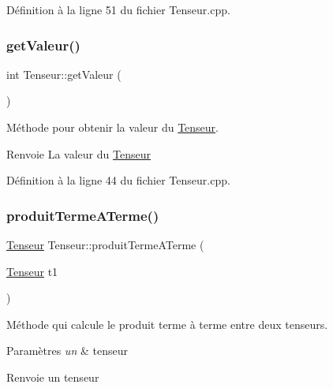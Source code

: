 Définition à la ligne 51 du fichier Tenseur.\+cpp.

\mbox{\label{class_tenseur_abf24ad6abb135909d0ec82142da47188}} 
\subsubsection{\texorpdfstring{get\+Valeur()}{getValeur()}}
{\footnotesize\ttfamily int Tenseur\+::get\+Valeur (\begin{DoxyParamCaption}{ }\end{DoxyParamCaption})}



Méthode pour obtenir la valeur du \hyperlink{class_tenseur}{Tenseur}. 

\begin{DoxyReturn}{Renvoie}
La valeur du \hyperlink{class_tenseur}{Tenseur} 
\end{DoxyReturn}


Définition à la ligne 44 du fichier Tenseur.\+cpp.

\mbox{\label{class_tenseur_a616b8fc8cfee2c3f601c567ba42c7422}} 
\subsubsection{\texorpdfstring{produit\+Terme\+A\+Terme()}{produitTermeATerme()}}
{\footnotesize\ttfamily \hyperlink{class_tenseur}{Tenseur} Tenseur\+::produit\+Terme\+A\+Terme (\begin{DoxyParamCaption}\item[{\hyperlink{class_tenseur}{Tenseur}}]{t1 }\end{DoxyParamCaption})}



Méthode qui calcule le produit terme à terme entre deux tenseurs. 


\begin{DoxyParams}{Paramètres}
{\em un} & tenseur \\
\hline
\end{DoxyParams}
\begin{DoxyReturn}{Renvoie}
un tenseur 
\end{DoxyReturn}
\mbox{\label{class_tenseur_a161be386a5d179f538234fceb152e80a}} 
